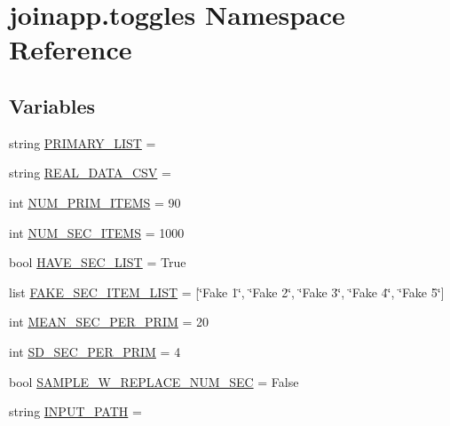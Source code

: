 \hypertarget{namespacejoinapp_1_1toggles}{}\section{joinapp.\+toggles Namespace Reference}
\label{namespacejoinapp_1_1toggles}
\subsection*{Variables}
\begin{DoxyCompactItemize}
\item 
string \mbox{\hyperlink{namespacejoinapp_1_1toggles_aa3470944adb98a68e764f2b0fff6e824}{P\+R\+I\+M\+A\+R\+Y\+\_\+\+L\+I\+ST}} = \textquotesingle{}\textquotesingle{}
\item 
string \mbox{\hyperlink{namespacejoinapp_1_1toggles_ae5554d1256520599a38819114dac5ba4}{R\+E\+A\+L\+\_\+\+D\+A\+T\+A\+\_\+\+C\+SV}} = \textquotesingle{}\textquotesingle{}
\item 
int \mbox{\hyperlink{namespacejoinapp_1_1toggles_ab00da8066e13855c26dcbf057482edea}{N\+U\+M\+\_\+\+P\+R\+I\+M\+\_\+\+I\+T\+E\+MS}} = 90
\item 
int \mbox{\hyperlink{namespacejoinapp_1_1toggles_a6ca89597f6f6e87f668a28469b0120f0}{N\+U\+M\+\_\+\+S\+E\+C\+\_\+\+I\+T\+E\+MS}} = 1000
\item 
bool \mbox{\hyperlink{namespacejoinapp_1_1toggles_aeccea94921e83781a543147ee68adbc0}{H\+A\+V\+E\+\_\+\+S\+E\+C\+\_\+\+L\+I\+ST}} = True
\item 
list \mbox{\hyperlink{namespacejoinapp_1_1toggles_a4ff32d157d0a422a4f4cae05765010ee}{F\+A\+K\+E\+\_\+\+S\+E\+C\+\_\+\+I\+T\+E\+M\+\_\+\+L\+I\+ST}} = \mbox{[}\char`\"{}Fake 1\char`\"{}, \char`\"{}Fake 2\char`\"{}, \char`\"{}Fake 3\char`\"{}, \char`\"{}Fake 4\char`\"{}, \char`\"{}Fake 5\char`\"{}\mbox{]}
\item 
int \mbox{\hyperlink{namespacejoinapp_1_1toggles_aaefbd234981061ba22f4465927774cba}{M\+E\+A\+N\+\_\+\+S\+E\+C\+\_\+\+P\+E\+R\+\_\+\+P\+R\+IM}} = 20
\item 
int \mbox{\hyperlink{namespacejoinapp_1_1toggles_ab4ff08599fc60d63b21813ecfc955c26}{S\+D\+\_\+\+S\+E\+C\+\_\+\+P\+E\+R\+\_\+\+P\+R\+IM}} = 4
\item 
bool \mbox{\hyperlink{namespacejoinapp_1_1toggles_af13f35bc5a3be1bf4f038217423c49e3}{S\+A\+M\+P\+L\+E\+\_\+\+W\+\_\+\+R\+E\+P\+L\+A\+C\+E\+\_\+\+N\+U\+M\+\_\+\+S\+EC}} = False
\item 
string \mbox{\hyperlink{namespacejoinapp_1_1toggles_aca6b14e235be3a92f729918cfcfed5e5}{I\+N\+P\+U\+T\+\_\+\+P\+A\+TH}} = \textquotesingle{}\textquotesingle{}

\end{DoxyCompactItemize}
